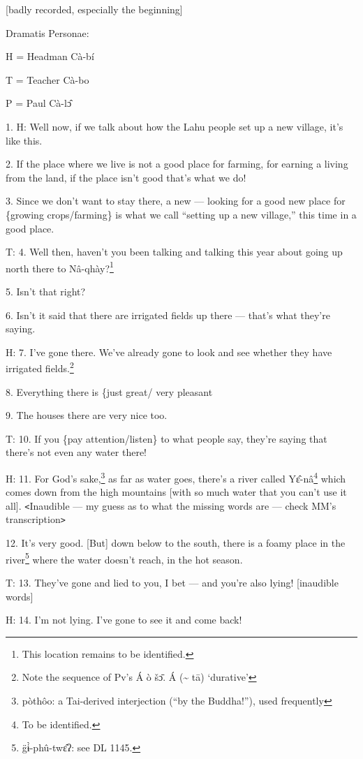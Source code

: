
[badly recorded, especially the beginning]

Dramatis Personae:

H = Headman Cà-bí

T = Teacher Cà-bo

P = Paul Cà-lɔ̂

1. H: Well now, if we talk about how the Lahu people set up a new village, it's
like this.

2. If the place where we live is not a good place for farming, for earning a living
from the land, if the place isn't good that's what we do!

3. Since we don't want to stay there, a new --- looking for a good new place for
\{growing crops/farming\} is what we call ``setting up a new village,'' this time
in a good place.

T: 4. Well then, haven't you been talking and talking this year about going up
north there to Nâ-qhày?\footnote{This location remains to be identified.}

5. Isn't that right?

6. Isn't it said that there are irrigated fields up there --- that's what they're
saying.

H: 7. I've gone there. We've already gone to look and see whether they have irrigated
fields.\footnote{Note the sequence of Pv's Á ò šɔ̄. Á (\textasciitilde{} tā) `durative'}

8. Everything there is \{just great/ very pleasant

9. The houses there are very nice too.

T: 10. If you \{pay attention/listen\} to what people say, they're saying that
there's not even any water there!

H: 11. For God's sake,\footnote{pòthôo: a Tai-derived interjection (``by the Buddha!''), used frequently} as far as water goes, there's a river called Yɛ̂-nâ\footnote{To be identified.}
which comes down from the high mountains [with so much water that you can't use
it all]. \texttt{<}Inaudible --- my guess as to what the missing words are ---
check MM's transcription\texttt{>}

12. It's very good. [But] down below to the south, there is a foamy place in the
river\footnote{g̈ɨ̀-phû-twɛ̂ʔ: see DL 1145.} where the water doesn't reach, in the hot season.

T: 13. They've gone and lied to you, I bet --- and you're also lying! [inaudible
words]

H: 14. I'm not lying. I've gone to see it and come back!

